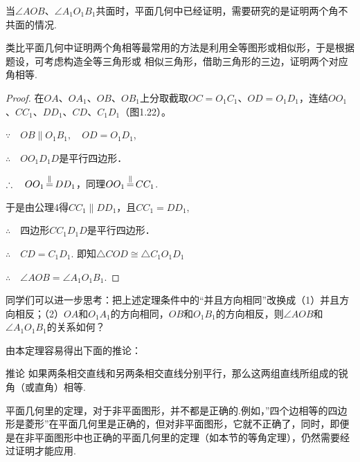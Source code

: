 \begin{analyze}
当$\angle AOB$、$\angle A_1O_1B_1$共面时，平面几何中已经证明，需要研究的是证明两个角不共面的情况.

类比平面几何中证明两个角相等最常用的方法是利用全等图形或相似形，于是根据题设，可考虑构造全等三角形或
相似三角形，借助三角形的三边，证明两个对应角相等.
\end{analyze}

\begin{proof}
在$OA$、$OA_1$、$OB$、$OB_1$上分取截取$OC=O_1C_1$、$OD=O_1D_1$，连结$OO_1$、$CC_1$、$DD_1$、$CD$、$C_1D_1$（图1.22）。

$\because\quad OB\parallel O_1B_1,\quad OD=O_1D_1$,

$\therefore\quad OO_1D_1D$是平行四边形．

$\therefore\quad OO_1\displaystyle\mathop{=}^{\parallel} DD_1$，同理$OO_1\displaystyle\mathop{=}^{\parallel} CC_1$.

于是由公理4得$CC_1\parallel DD_1$，且$CC_1=DD_1$,

$\therefore\quad $四边形$CC_1D_1D$是平行四边形．

$\therefore\quad CD=C_1D_1$. 即知$\triangle COD\cong \triangle C_1O_1D_1$

$\therefore\quad \angle AOB=\angle A_1O_1B_1$.
\end{proof}

同学们可以进一步思考：把上述定理条件中的“并且方向相同”改换成（1）并且方向相反；（2）$OA$和$O_1A_1$的方向相同，$OB$和$O_1B_1$的方向相反，则$\angle AOB$和$\angle A_1O_1B_1$的关系如何？

由本定理容易得出下面的推论：

\begin{thm}
    {推论} 如果两条相交直线和另两条相交直线分别平行，那么这两组直线所组成的锐角（或直角）相等.
\end{thm}

\begin{rmk}
    平面几何里的定理，对于非平面图形，并不都是正确的.例如，”四个边相等的四边形是菱形”在平面几何里是正确的，但对非平面图形，它就不正确了，同时，即便是在非平面图形中也正确的平面几何里的定理（如本节的等角定理），仍然需要经过证明才能应用.
\end{rmk}

